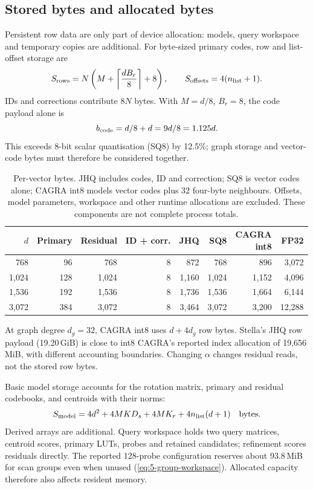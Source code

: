 \subsection{Stored bytes and allocated bytes}

Persistent row data are only part of device allocation: models, query
workspace and temporary copies are additional. For byte-sized primary
codes, row and list-offset storage are
\begin{equation}
 S_{\rm rows}=N\left(M+\left\lceil\frac{dB_r}{8}\right\rceil+8\right),
 \qquad S_{\rm offsets}=4(n_{\rm list}+1).
 \label{eq:4-row-storage}
\end{equation}
IDs and corrections contribute $8N$ bytes. With $M=d/8$, $B_r=8$,
the code payload alone is
\[
 b_{\rm code}=d/8+d=9d/8=1.125d.
\]
This exceeds 8-bit scalar quantisation (SQ8) by 12.5\%; graph storage
and vector-code bytes must therefore be considered together.

\begin{table}[!htbp]
\centering
\caption[Per-vector storage model]{Per-vector bytes. JHQ includes codes, ID and correction; SQ8 is
vector codes alone; CAGRA int8 models vector codes plus 32 four-byte
neighbours. Offsets, model parameters, workspace and other runtime
allocations are excluded. These components are not complete process totals.}
\label{tab:4-bytes}
\footnotesize\setlength{\tabcolsep}{4pt}
\begin{tabular}{@{}rrrrrrrr@{}}
\toprule
$d$ & Primary & Residual & ID + corr. & JHQ & SQ8 & \shortstack{CAGRA\\int8} & FP32 \\
\midrule
768 & 96 & 768 & 8 & 872 & 768 & 896 & 3,072 \\
1,024 & 128 & 1,024 & 8 & 1,160 & 1,024 & 1,152 & 4,096 \\
1,536 & 192 & 1,536 & 8 & 1,736 & 1,536 & 1,664 & 6,144 \\
3,072 & 384 & 3,072 & 8 & 3,464 & 3,072 & 3,200 & 12,288 \\
\bottomrule
\end{tabular}
\end{table}

At graph degree $d_g=32$, CAGRA int8 uses $d+4d_g$ row bytes. Stella's
JHQ row payload (19.20\,GiB) is close to int8 CAGRA's reported index
allocation of 19,656\,MiB, with different accounting boundaries.
Changing $\alpha$ changes residual reads, not the stored row bytes.

Basic model storage accounts for the rotation matrix, primary and
residual codebooks, and centroids with their norms:
\[
 S_{\rm model}
 =4d^2+4MKD_s+4MK_r+4n_{\rm list}(d+1)
 \quad\text{bytes}.
\]
Derived arrays are additional. Query workspace holds two query matrices,
centroid scores, primary LUTs, probes and retained candidates; refinement
scores residuals directly. The reported 128-probe configuration reserves
about 93.8\,MiB for scan groups even when unused
(\cref{eq:5-group-workspace}). Allocated capacity therefore also affects
resident memory.

